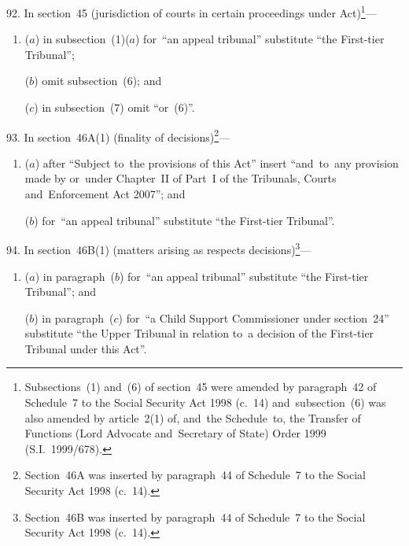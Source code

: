 \documentclass[12pt,a4paper]{article}
\begin{document}
\medskip

92.  In section~45 (jurisdiction of courts in certain proceedings under Act)\footnote{Subsections~(1) and~(6) of section~45 were amended by paragraph~42 of Schedule~7 to the Social Security Act 1998 (c.~14) and~subsection~(6) was also amended by article~2(1) of, and~the Schedule~to, the Transfer of Functions (Lord Advocate and~Secretary of State) Order 1999 (S.I.~1999/678).}—
\begin{enumerate}\item[]
($a$) in subsection~(1)($a$)  for~“an appeal tribunal” substitute “the First-tier Tribunal”;

($b$) omit subsection~(6); and

($c$) in subsection~(7) omit “or~(6)”.
\end{enumerate}

\medskip

93.  In section~46A(1) (finality of decisions)\footnote{Section~46A was inserted by paragraph~44 of Schedule~7 to the Social Security Act 1998 (c.~14).}—
\begin{enumerate}\item[]
($a$) after “Subject to~the provisions of this Act” insert “and~to~any provision made by or~under Chapter~II of Part~I of the Tribunals, Courts and~Enforcement Act 2007”; and

($b$) for~“an appeal tribunal” substitute “the First-tier Tribunal”.
\end{enumerate}

\medskip

94.  In section~46B(1) (matters arising as respects decisions)\footnote{Section~46B was inserted by paragraph~44 of Schedule~7 to the Social Security Act 1998 (c.~14).}—
\begin{enumerate}\item[]
($a$) in paragraph~($b$)  for~“an appeal tribunal” substitute “the First-tier Tribunal”; and

($b$) in paragraph~($c$)  for~“a Child Support Commissioner under section~24” substitute “the Upper Tribunal in relation to~a decision of the First-tier Tribunal under this Act”.
\end{enumerate}

\medskip
\end{document}
